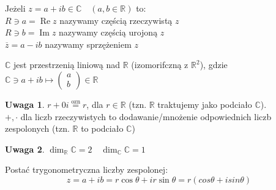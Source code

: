 \documentclass[10pt]{article}
\theoremstyle{definition}
\theoremstyle{definition}
\theoremstyle{definition}
\theoremstyle{definition}
\theoremstyle{remark}
\theoremstyle{definition}
\newtheorem*{uw}{Uwaga}
\theoremstyle{definition}
\theoremstyle{definition}
\theoremstyle{definition}
\theoremstyle{definition}
\begin{document}
\begin{minipage}[c]{0.65\textwidth}
\begin{df}
    Jeżeli $ z = a + ib \in \mathbb{C} \quad (a,b \in \mathbb{R})$ to: \\ 
    $R \ni a = \operatorname{Re} z $ nazywamy częścią rzeczywistą $z$ \\ 
    $R \ni b = \operatorname{Im} z$ nazywamy częścią urojoną $z$ \\ 
    $\overline{z} = a - ib$ nazywamy sprzężeniem $z$
\end{df} 
\end{minipage}%
\begin{minipage}[c]{0.3\textwidth}
\end{minipage}
\begin{ft} 
    $\mathbb{C}$ jest przestrzenią liniową nad $\mathbb{R}$ (izomorifczną z $\mathbb{R}^2$), gdzie 
    $\mathbb{C} \ni a + ib \mapsto \begin{pmatrix} a \\ b \end{pmatrix} \in \mathbb{R}$
\end{ft}
\begin{uw} 
    $r + 0i \overset{\text{ozn}}{=} r$, dla $r \in \mathbb{R}$ (tzn. $\mathbb{R}$ traktujemy jako 
    podciało $\mathbb{C}$). \\ 
    $+,\cdot$ dla liczb rzeczywistych to dodawanie/mnożenie odpowiednich liczb zespolonych
    (tzn. $\mathbb{R}$ to podciało $\mathbb{C}$)
\end{uw} 
\begin{uw} $\dim_\mathbb{R} \mathbb{C} = 2 \quad \dim_\mathbb{C} \mathbb{C} = 1$ \end{uw}
\begin{minipage}[c]{0.65\textwidth}
    \begin{df} Postać trygonometryczna liczby zespolonej: 
        \[ z = a+ib = r\cos \theta + ir\sin \theta = r(cos\theta + i sin \theta) \] \end{df} 
\end{minipage}
\end{document}
